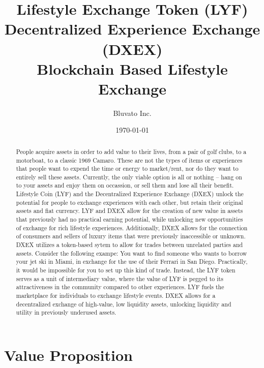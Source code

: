 \documentclass[11pt]{article}
\begin{document}
\title{%
Lifestyle Exchange Token (LYF)\\Decentralized Experience Exchange (DXEX)\\[1mm] 
\large Blockchain Based Lifestyle Exchange}
\author{Bluvato Inc.}
\date{\today}
\maketitle


\begin{abstract}
People acquire assets in order to add value to their lives, from a pair of golf clubs, to a motorboat, to a classic 1969 Camaro. These are not the types of items or experiences that people want to expend the time or energy to market/rent, nor do they want to entirely sell these assets. Currently, the only viable option is all or nothing -- hang on to your assets and enjoy them on occassion, or sell them and lose all their benefit. Lifestyle Coin (LYF) and the Decentralized Experience Exchange (DXEX) unlock the potential for people to exchange experiences with each other, but retain their original assets and fiat currency. LYF and DXEX allow for the creation of new value in assets that previously had no practical earning potential, while unlocking new opportunities of exchange for rich lifestyle experiences. Additionally, DXEX allows for the connection of consumers and sellers of luxury items that were previously inaccessible or unknown. DXEX utilizes a token-based sytem to allow for trades between unrelated parties and assets. Consider the following exampe: You want to find someone who wants to borrow your jet ski in Miami, in exchange for the use of their Ferrari in San Diego. Practically, it would be impossible for you to set up this kind of trade. Instead, the LYF token serves as a unit of intermediary value, where the value of LYF is pegged to its attractiveness in the community compared to other experiences. LYF fuels the marketplace for individuals to exchange lifestyle events. DXEX allows for a decentralized exchange of high-value, low liquidity assets, unlocking liquidity and utility in previously underused assets.

\end{abstract}
\pagebreak

\tableofcontents
\newpage

\section{Value Proposition}
\label{sec-2}
\end{document}

